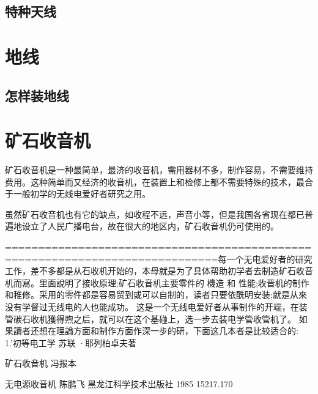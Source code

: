 \documentclass[12pt,UTF8]{ctexbook}
\begin{document}
\section{特种天线}


\chapter{地线}

\section{怎样装地线}

\chapter{矿石收音机}

矿石收音机是一种最简单，最济的收音机，需用器材不多，制作容易，不需要维持费用。这种简单而又经济的收音机，在装置上和检修上都不需要特殊的技术，最合于一般初学的无线电爱好者研究之用。

虽然矿石收音机也有它的缺点，如收程不远，声音小等，但是我国各省现在都已普遍地设立了人民广播电台，故在很大的地区内，矿石收音机仍可使用的。

==============================================================================每一个无电爱好者的研究工作，差不多都是从石收机开始的，本母就是为了具体帮助初学者去制造矿石收音机而寫。里面說明了接收原理;矿石收音机主要零件的 機造 和 性能;收晋机的制作和稚修。采用的零件都是容易贸到或可以自制的，读者只要依酰明安装;就是从來没有学督过无线电的人也能成功。
这是一个无线电爱好者从事制作的开端，在装管碳石收机獲得煦之后，就可以在这个基碰上，选一步去装电学管收管机了。
如果讀者还想在理論方面和制作方面作深一步的研，下面这几本者是比较适合的:
1.'初等电工学
苏联 ·耶列柏卓夫著

\backmatter


矿石收音机 冯报本

无电源收音机	陈鹏飞	黑龙江科学技术出版社 1985	15217.170
\end{document}
